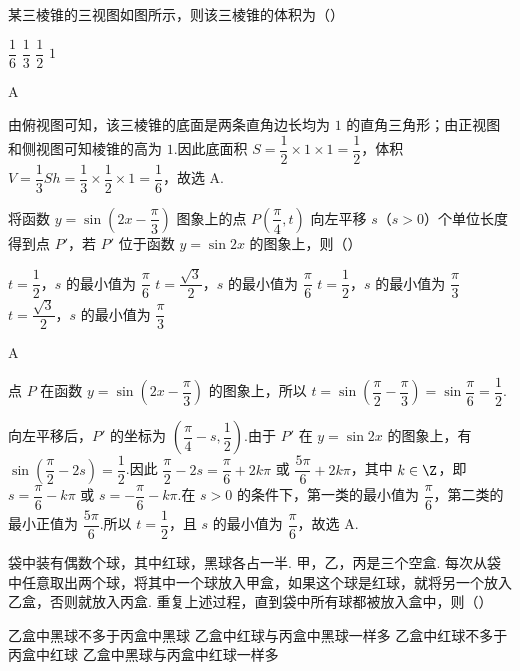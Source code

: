 \begin{problem}
某三棱锥的三视图如图所示，则该三棱锥的体积为（\quad）


\choices
    {\(\dfrac16\)}
    {\(\dfrac13\)}
    {\(\dfrac12\)}
    {\(1\)}
\end{problem}

\begin{answer}
A
\end{answer}

\begin{solution}
由俯视图可知，该三棱锥的底面是两条直角边长均为 \(1\) 的直角三角形；由正视图和侧视图可知棱锥的高为 \(1\).因此底面积
\(S=\dfrac12\times1\times1=\dfrac12\)，体积
\(V=\dfrac13Sh=\dfrac13\times\dfrac12\times1=\dfrac16\)，故选 A.
\end{solution}

\begin{problem}
将函数 \(y=\sin\left(2x-\dfrac{\pi}{3}\right)\) 图象上的点 \(P\left(\dfrac{\pi}{4},t\right)\) 向左平移 \(s\)（\(s>0\)）个单位长度得到点 \(P'\)，若 \(P'\) 位于函数 \(y=\sin2x\) 的图象上，则（\quad）

\choices
    {\(t=\dfrac12\)，\(s\) 的最小值为 \(\dfrac{\pi}{6}\)}
    {\(t=\dfrac{\sqrt3}{2}\)，\(s\) 的最小值为 \(\dfrac{\pi}{6}\)}
    {\(t=\dfrac12\)，\(s\) 的最小值为 \(\dfrac{\pi}{3}\)}
    {\(t=\dfrac{\sqrt3}{2}\)，\(s\) 的最小值为 \(\dfrac{\pi}{3}\)}
\end{problem}

\begin{answer}
A
\end{answer}

\begin{solution}
点 \(P\) 在函数 \(y=\sin\left(2x-\dfrac\pi3\right)\) 的图象上，所以
\(t=\sin\left(\dfrac\pi2-\dfrac\pi3\right)=\sin\dfrac\pi6=\dfrac12\).

向左平移后，\(P'\) 的坐标为 \(\left(\dfrac\pi4-s,\dfrac12\right)\).由于 \(P'\) 在 \(y=\sin2x\) 的图象上，有
\(\sin\left(\dfrac\pi2-2s\right)=\dfrac12\).因此
\(\dfrac\pi2-2s=\dfrac\pi6+2k\pi\) 或 \(\dfrac{5\pi}6+2k\pi\)，其中 \(k\in\Z\)，即
\(s=\dfrac\pi6-k\pi\) 或 \(s=-\dfrac\pi6-k\pi\).在 \(s>0\) 的条件下，第一类的最小值为 \(\dfrac\pi6\)，第二类的最小正值为 \(\dfrac{5\pi}6\).所以 \(t=\dfrac12\)，且 \(s\) 的最小值为 \(\dfrac\pi6\)，故选 A.
\end{solution}

\begin{problem}
袋中装有偶数个球，其中红球，黑球各占一半. 甲，乙，丙是三个空盒. 每次从袋中任意取出两个球，将其中一个球放入甲盒，如果这个球是红球，就将另一个放入乙盒，否则就放入丙盒. 重复上述过程，直到袋中所有球都被放入盒中，则（\quad）

\choices
    {乙盒中黑球不多于丙盒中黑球}
    {乙盒中红球与丙盒中黑球一样多}
    {乙盒中红球不多于丙盒中红球}
    {乙盒中黑球与丙盒中红球一样多}
\end{problem}

